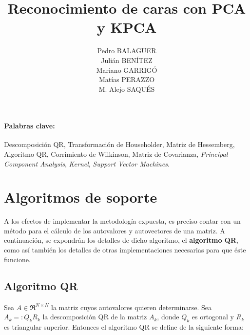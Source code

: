 \documentclass[12pt, twocolumn]{article}
\begin{document}
	\title{Reconocimiento de caras con PCA y KPCA}
	\author{Pedro BALAGUER \\ Julián BENÍTEZ \\ Mariano GARRIGÓ \\ Matías PERAZZO \\ M. Alejo SAQUÉS}
	\date{}
	\maketitle
	
	\begin{abstract}
		
		
	\end{abstract}
	
	\paragraph{Palabras clave:} Descomposición QR, Transformación de Householder, Matriz de Hessemberg, Algoritmo QR, Corrimiento de Wilkinson, Matriz de Covarianza, \textit{Principal Component Analysis}, \textit{Kernel}, \textit{Support Vector Machines}.
	
	\section{Algoritmos de soporte}
	
	\paragraph{} A los efectos de implementar la metodología expuesta, es preciso contar con un método para el cálculo de los autovalores y autovectores de una matriz. A continuación, se expondrán los detalles de dicho algoritmo, el \textbf{algoritmo QR}, como así también los detalles de otras implementaciones necesarias para que éste funcione.
	
	\subsection{Algoritmo QR}
	
	\paragraph{} Sea $A \in \Re^{N \times N}$ la matriz cuyos autovalores quieren determinarse. Sea $A_{k}=:Q_{k}R_{k}$ la descomposición QR de la matriz $A_{k}$, donde $Q_{k}$ es ortogonal y $R_{k}$ es triangular superior. Entonces el algoritmo QR se define de la siguiente forma:
	
\end{document}
